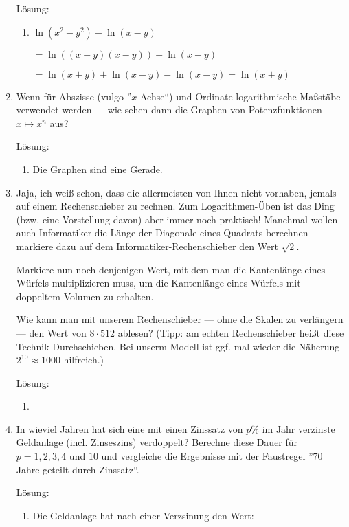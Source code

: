 \documentclass[../main.tex]{subfiles}
\begin{document}
\begin{enumerate}
	      Lösung:
	      \begin{enumerate}
		      \item \( \ln(x^2 - y^2) - \ln(x - y) \)

		            \( = \ln((x + y)(x - y)) - \ln(x - y) \)

		            \( = \ln(x + y) + \ln(x - y) - \ln(x - y)
		            = \ln (x + y) \)
	      \end{enumerate}
	\item Wenn für Abszisse (vulgo ”\( x \)-Achse“) und Ordinate logarithmische
	      Maßstäbe verwendet werden —
	      wie sehen dann die Graphen von Potenzfunktionen \( x \mapsto x^n \) aus?

	      Lösung:
	      \begin{enumerate}
		      \item Die Graphen sind eine Gerade.
	      \end{enumerate}
	\item Jaja, ich weiß schon, dass die allermeisten von Ihnen nicht vorhaben, jemals auf einem Rechenschieber zu rechnen.
	      Zum Logarithmen-Üben ist das Ding (bzw. eine Vorstellung davon) aber immer noch praktisch!
	      Manchmal wollen auch Informatiker die Länge der Diagonale eines Quadrats berechnen — markiere dazu auf dem
	      Informatiker-Rechenschieber den Wert \( \sqrt{2} \).

	      Markiere nun noch denjenigen Wert, mit dem man die Kantenlänge eines Würfels multiplizieren muss,
	      um die Kantenlänge eines Würfels mit doppeltem Volumen zu erhalten.

	      Wie kann man mit unserem Rechenschieber — ohne die Skalen zu verlängern —
	      den Wert von \( 8 \cdot 512 \) ablesen?
	      (Tipp: am echten Rechenschieber heißt diese Technik Durchschieben. Bei unserm Modell ist ggf.
	      mal wieder die Näherung \( 2^{10} \approx 1000 \) hilfreich.)

	      Lösung:
	      \begin{enumerate}
		      \item
	      \end{enumerate}
	\item In wieviel Jahren hat sich eine mit einen Zinssatz von \( p\% \)
	      im Jahr verzinste Geldanlage (incl. Zinseszins) verdoppelt?
	      Berechne diese Dauer für \( p = 1,2,3,4 \) und \( 10 \) und
	      vergleiche die Ergebnisse mit der Faustregel ”\( 70 \) Jahre geteilt durch
	      Zinssatz“.

	      Lösung:
	      \begin{enumerate}
		      \item Die Geldanlage hat nach einer Verzsinung den Wert:


\end{enumerate}
\end{enumerate}
\end{document}
